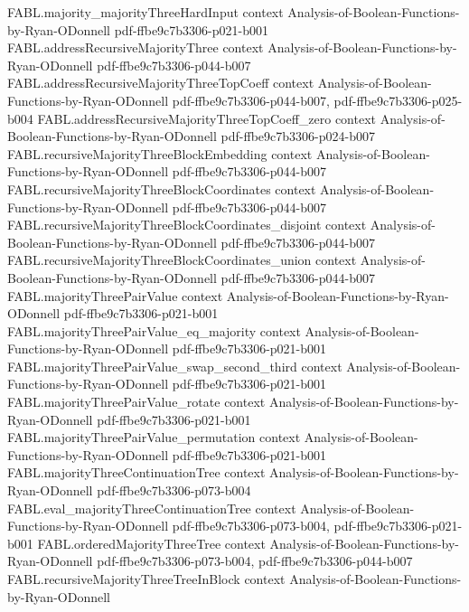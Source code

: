 \begin{theorem}
\proofstep
  {FABL.majority_majorityThreeHardInput}
  {context}
  {Analysis-of-Boolean-Functions-by-Ryan-ODonnell}
  {pdf-ffbe9c7b3306-p021-b001}
\proofstep
  {FABL.addressRecursiveMajorityThree}
  {context}
  {Analysis-of-Boolean-Functions-by-Ryan-ODonnell}
  {pdf-ffbe9c7b3306-p044-b007}
\proofstep
  {FABL.addressRecursiveMajorityThreeTopCoeff}
  {context}
  {Analysis-of-Boolean-Functions-by-Ryan-ODonnell}
  {pdf-ffbe9c7b3306-p044-b007,
    pdf-ffbe9c7b3306-p025-b004}
\proofstep
  {FABL.addressRecursiveMajorityThreeTopCoeff_zero}
  {context}
  {Analysis-of-Boolean-Functions-by-Ryan-ODonnell}
  {pdf-ffbe9c7b3306-p024-b007}
\proofstep
  {FABL.recursiveMajorityThreeBlockEmbedding}
  {context}
  {Analysis-of-Boolean-Functions-by-Ryan-ODonnell}
  {pdf-ffbe9c7b3306-p044-b007}
\proofstep
  {FABL.recursiveMajorityThreeBlockCoordinates}
  {context}
  {Analysis-of-Boolean-Functions-by-Ryan-ODonnell}
  {pdf-ffbe9c7b3306-p044-b007}
\proofstep
  {FABL.recursiveMajorityThreeBlockCoordinates_disjoint}
  {context}
  {Analysis-of-Boolean-Functions-by-Ryan-ODonnell}
  {pdf-ffbe9c7b3306-p044-b007}
\proofstep
  {FABL.recursiveMajorityThreeBlockCoordinates_union}
  {context}
  {Analysis-of-Boolean-Functions-by-Ryan-ODonnell}
  {pdf-ffbe9c7b3306-p044-b007}
\proofstep
  {FABL.majorityThreePairValue}
  {context}
  {Analysis-of-Boolean-Functions-by-Ryan-ODonnell}
  {pdf-ffbe9c7b3306-p021-b001}
\proofstep
  {FABL.majorityThreePairValue_eq_majority}
  {context}
  {Analysis-of-Boolean-Functions-by-Ryan-ODonnell}
  {pdf-ffbe9c7b3306-p021-b001}
\proofstep
  {FABL.majorityThreePairValue_swap_second_third}
  {context}
  {Analysis-of-Boolean-Functions-by-Ryan-ODonnell}
  {pdf-ffbe9c7b3306-p021-b001}
\proofstep
  {FABL.majorityThreePairValue_rotate}
  {context}
  {Analysis-of-Boolean-Functions-by-Ryan-ODonnell}
  {pdf-ffbe9c7b3306-p021-b001}
\proofstep
  {FABL.majorityThreePairValue_permutation}
  {context}
  {Analysis-of-Boolean-Functions-by-Ryan-ODonnell}
  {pdf-ffbe9c7b3306-p021-b001}
\proofstep
  {FABL.majorityThreeContinuationTree}
  {context}
  {Analysis-of-Boolean-Functions-by-Ryan-ODonnell}
  {pdf-ffbe9c7b3306-p073-b004}
\proofstep
  {FABL.eval_majorityThreeContinuationTree}
  {context}
  {Analysis-of-Boolean-Functions-by-Ryan-ODonnell}
  {pdf-ffbe9c7b3306-p073-b004,
    pdf-ffbe9c7b3306-p021-b001}
\proofstep
  {FABL.orderedMajorityThreeTree}
  {context}
  {Analysis-of-Boolean-Functions-by-Ryan-ODonnell}
  {pdf-ffbe9c7b3306-p073-b004,
    pdf-ffbe9c7b3306-p044-b007}
\proofstep
  {FABL.recursiveMajorityThreeTreeInBlock}
  {context}
  {Analysis-of-Boolean-Functions-by-Ryan-ODonnell}

\end{theorem}
